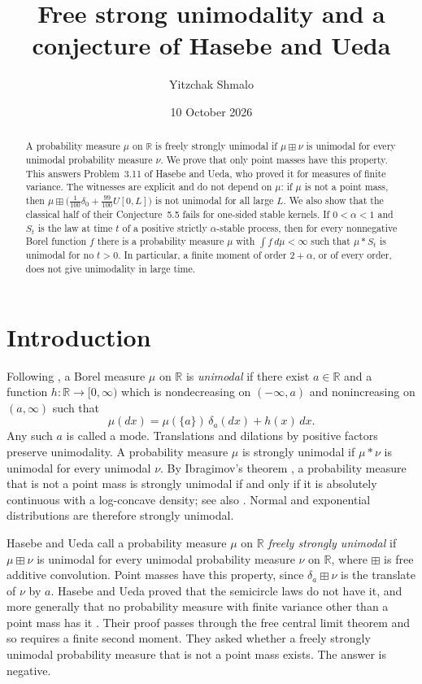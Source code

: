 \documentclass[11pt]{amsart}
\title[Free strong unimodality]{Free strong unimodality and a conjecture of Hasebe and Ueda}
\author{Yitzchak Shmalo}
\date{10 October 2026}
\numberwithin{equation}{section}
\theoremstyle{definition}
\theoremstyle{remark}
\newcommand{\R}{\mathbb R}
\begin{document}
\begin{abstract}
A probability measure $\mu$ on $\R$ is freely strongly unimodal if $\mu\boxplus\nu$ is unimodal for every unimodal probability measure $\nu$. We prove that only point masses have this property. This answers Problem~3.11 of Hasebe and Ueda, who proved it for measures of finite variance. The witnesses are explicit and do not depend on $\mu$: if $\mu$ is not a point mass, then $\mu\boxplus\bigl(\frac1{100}\delta_0+\frac{99}{100}U[0,L]\bigr)$ is not unimodal for all large $L$. We also show that the classical half of their Conjecture~5.5 fails for one-sided stable kernels. If $0<\alpha<1$ and $S_t$ is the law at time $t$ of a positive strictly $\alpha$-stable process, then for every nonnegative Borel function $f$ there is a probability measure $\mu$ with $\int f\,d\mu<\infty$ such that $\mu\ast S_t$ is unimodal for no $t>0$. In particular, a finite moment of order $2+\alpha$, or of every order, does not give unimodality in large time.
\end{abstract}
\maketitle

\section{Introduction}
Following \cite{HU}, a Borel measure $\mu$ on $\R$ is \emph{unimodal} if there exist $a\in\R$ and a function $h\colon\R\to[0,\infty)$ which is nondecreasing on $(-\infty,a)$ and nonincreasing on $(a,\infty)$ such that
\begin{equation}\label{eq:unimodal}
\mu(dx)=\mu(\{a\})\,\delta_a(dx)+h(x)\,dx .
\end{equation}
Any such $a$ is called a mode. Translations and dilations by positive factors preserve unimodality. A probability measure $\mu$ is strongly unimodal if $\mu\ast\nu$ is unimodal for every unimodal $\nu$. By Ibragimov's theorem \cite{Ib}, a probability measure that is not a point mass is strongly unimodal if and only if it is absolutely continuous with a log-concave density; see also \cite[Theorem~52.3]{Sato}. Normal and exponential distributions are therefore strongly unimodal.

Hasebe and Ueda \cite[Definition~3.8]{HU} call a probability measure $\mu$ on $\R$ \emph{freely strongly unimodal} if $\mu\boxplus\nu$ is unimodal for every unimodal probability measure $\nu$ on $\R$, where $\boxplus$ is free additive convolution. Point masses have this property, since $\delta_a\boxplus\nu$ is the translate of $\nu$ by $a$. Hasebe and Ueda proved that the semicircle laws do not have it, and more generally that no probability measure with finite variance other than a point mass has it \cite[Theorem~3.10]{HU}. Their proof passes through the free central limit theorem and so requires a finite second moment. They asked \cite[Problem~3.11]{HU} whether a freely strongly unimodal probability measure that is not a point mass exists. The answer is negative.
\end{document}
